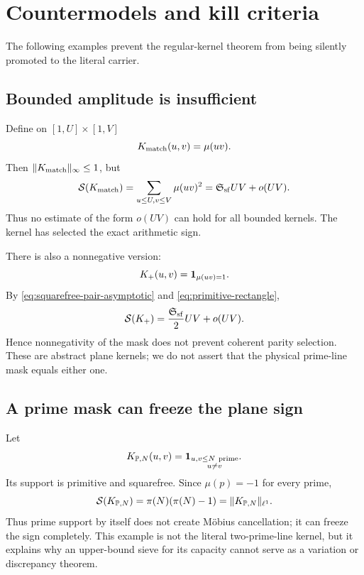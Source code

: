 \section{Countermodels and kill criteria}
\label{sec:countermodels}

The following examples prevent the regular-kernel theorem from being
silently promoted to the literal carrier.

\subsection{Bounded amplitude is insufficient}

Define on \([1,U]\times[1,V]\)
\[
 K_{\rm match}(u,v)=\mu(uv).
\]
Then \(\|K_{\rm match}\|_\infty\le1\), but
\begin{equation}
 \mathcal S(K_{\rm match})
 =
 \sum_{u\le U,v\le V}\mu(uv)^2
 =
 \mathfrak S_{\rm sf}UV+o(UV).
\label{eq:sign-matched-countermodel}
\end{equation}
Thus no estimate of the form \(o(UV)\) can hold for all bounded kernels.
The kernel has selected the exact arithmetic sign.

There is also a nonnegative version:
\[
 K_+(u,v)=\mathbf 1_{\mu(uv)=1}.
\]
By \eqref{eq:squarefree-pair-asymptotic} and
\eqref{eq:primitive-rectangle},
\begin{equation}
 \mathcal S(K_+)
 =
 \frac{\mathfrak S_{\rm sf}}2UV+o(UV).
\label{eq:nonnegative-sign-selected-mask}
\end{equation}
Hence nonnegativity of the mask does not prevent coherent parity selection.
These are abstract plane kernels; we do not assert that the physical
prime-line mask equals either one.

\subsection{A prime mask can freeze the plane sign}

Let
\[
 K_{\mathbb P,N}(u,v)
 =
 \mathbf 1_{\substack{u,v\le N\ {\rm prime}\\u\ne v}}.
\]
Its support is primitive and squarefree.  Since \(\mu(p)=-1\) for every
prime,
\[
 \mathcal S(K_{\mathbb P,N})
 =
 \pi(N)(\pi(N)-1)
 =
 \|K_{\mathbb P,N}\|_{\ell^1}.
\]
Thus prime support by itself does not create M\"obius cancellation; it can
freeze the sign completely.  This example is not the literal two-prime-line
kernel, but it explains why an upper-bound sieve for its capacity cannot
serve as a variation or discrepancy theorem.


